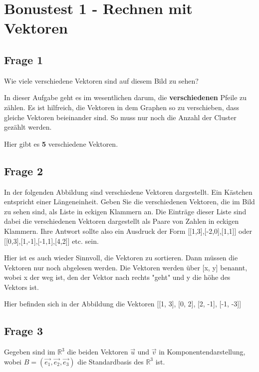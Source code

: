 \chapter{Bonustest 1 - Rechnen mit Vektoren}

\section{Frage 1}
Wie viele verschiedene Vektoren sind auf diesem Bild zu sehen?

In dieser Aufgabe geht es im wesentlichen darum, die \textbf{verschiedenen} Pfeile zu zählen. Es ist 
hilfreich, die Vektoren in dem Graphen so zu verschieben, dass gleiche Vektoren beieinander sind. So 
muss nur noch die Anzahl der Cluster gezählt werden.


Hier gibt es \textbf{5} verschiedene Vektoren.

\section{Frage 2}
In der folgenden Abbildung sind verschiedene Vektoren dargestellt. Ein Kästchen entspricht einer Längeneinheit.
Geben Sie die verschiedenen Vektoren, die im Bild zu sehen sind, als Liste in eckigen Klammern an. 
Die Einträge dieser Liste sind dabei die verschiedenen Vektoren dargestellt als Paare von Zahlen in eckigen Klammern. 
Ihre Antwort sollte also ein Ausdruck der Form [[1,3],[-2,0],[1,1]] oder [[0,3],[1,-1],[-1,1],[4,2]] etc. sein. 

Hier ist es auch wieder Sinnvoll, die Vektoren zu sortieren. Dann müssen die Vektoren nur noch abgelesen werden.
Die Vektoren werden über [x, y] benannt, wobei x der weg ist, den der Vektor nach rechts "geht" und y die höhe 
des Vektors ist.


Hier befinden sich in der Abbildung die Vektoren [[1, 3], [0, 2], [2, -1], [-1, -3]]

\section{Frage 3}
Gegeben sind im $\mathbb{R}^3$ die beiden Vektoren $\vec{u}$ und $\vec{v}$ in Komponentendarstellung,
wobei $B = (\vec{e_1}, \vec{e_2}, \vec{e_3})$ die Standardbasis des $\mathbb{R}^3$ ist.

